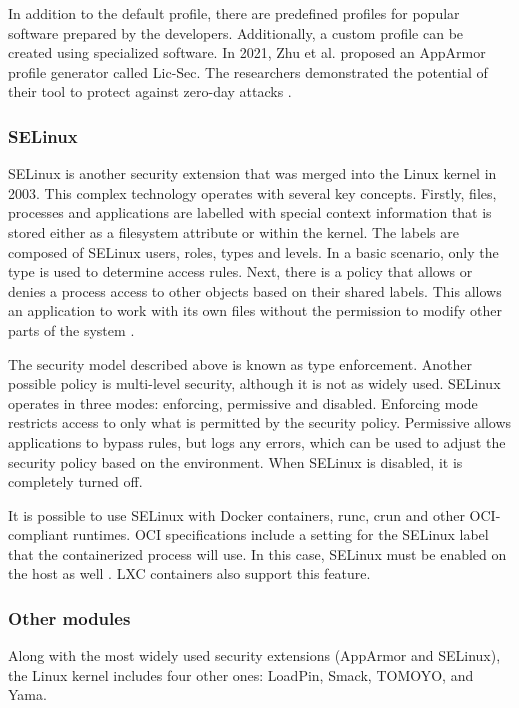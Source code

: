 In addition to the default profile, there are predefined profiles for popular software prepared by the developers. Additionally, a custom profile can be created using specialized software. In 2021, Zhu et al. proposed an AppArmor profile generator called Lic-Sec. The researchers demonstrated the potential of their tool to protect against zero-day attacks \cite{sd:licsec}.

\subsubsection*{SELinux}

SELinux is another security extension that was merged into the Linux kernel in 2003. This complex technology operates with several key concepts. Firstly, files, processes and applications are labelled with special context information that is stored either as a filesystem attribute or within the kernel. The labels are composed of SELinux users, roles, types and levels. In a basic scenario, only the type is used to determine access rules. Next, there is a policy that allows or denies a process access to other objects based on their shared labels. This allows an application to work with its own files without the permission to modify other parts of the system \cite{c:13}.

The security model described above is known as type enforcement. Another possible policy is multi-level security, although it is not as widely used. SELinux operates in three modes: enforcing, permissive and disabled. Enforcing mode restricts access to only what is permitted by the security policy. Permissive allows applications to bypass rules, but logs any errors, which can be used to adjust the security policy based on the environment. When SELinux is disabled, it is completely turned off.

It is possible to use SELinux with Docker containers, runc, crun and other OCI-compliant runtimes. OCI specifications include a setting for the SELinux label that the containerized process will use. In this case, SELinux must be enabled on the host as well \cite{d:config}. LXC containers also support this feature.

\subsubsection*{Other modules}

Along with the most widely used security extensions (AppArmor and SELinux), the Linux kernel includes four other ones: LoadPin, Smack, TOMOYO, and Yama.

